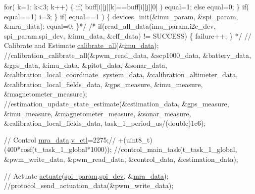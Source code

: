 \begin{DoxyCode}
{\textcolor{comment}{            for( k=1; k<3; k++)}
\textcolor{comment}{            \{}
\textcolor{comment}{              if( buff[i][j][k]==buff[i][j][0] )}
\textcolor{comment}{                equal=1;}
\textcolor{comment}{              else}
\textcolor{comment}{                equal=0;}
\textcolor{comment}{            \}}
\textcolor{comment}{          if( equal==1)}
\textcolor{comment}{            i=3;}
\textcolor{comment}{        \}}
\textcolor{comment}{        if( equal==1 )}
\textcolor{comment}{        \{}
\textcolor{comment}{          devices\_init(&imu\_param, &spi\_param, &mra\_data);}
\textcolor{comment}{          equal=0;}
\textcolor{comment}{        \}*/}
\textcolor{comment}{/*    if(read\_all\_data(imu\_param.i2c\_dev, spi\_param.spi\_dev, &imu\_data,
       &eff\_data) != SUCCESS)}
\textcolor{comment}{    \{}
\textcolor{comment}{        failure++;}
\textcolor{comment}{    \}}
\textcolor{comment}{*/}
    \textcolor{comment}{// Calibrate and Estimate}
    \hyperlink{calibration_2calibration_8c_a043045246cf217758281222214c4addc}{calibrate\_all}(&\hyperlink{main2_01_07C_xC3_xB3pia_01em_01conflito_01de_01Caio_01Gustavo_01Mesquita_01Angelo_012013-04-28_08_8c_a3cfea12cbe9ca7f1681c950e4cd68606}{imu\_data});
    \textcolor{comment}{//calibration\_calibrate\_all(&pwm\_read\_data, &scp1000\_data, &battery\_data,
       &gps\_data, &imu\_data, &pitot\_data, &sonar\_data,
       &calibration\_local\_coordinate\_system\_data, &calibration\_altimeter\_data, &calibration\_local\_fields\_data,
       &gps\_measure, &imu\_measure, &magnetometer\_measure);}
    \textcolor{comment}{//estimation\_update\_state\_estimate(&estimation\_data, &gps\_measure,
       &imu\_measure, &magnetometer\_measure, &sonar\_measure, &calibration\_local\_fields\_data,
       task\_1\_period\_us/(double)1e6);}

    \textcolor{comment}{// Control}
    \hyperlink{main2_01_07C_xC3_xB3pia_01em_01conflito_01de_01Caio_01Gustavo_01Mesquita_01Angelo_012013-04-28_08_8c_abc42e18d2909e9bc119316283f4ed9db}{mra\_data}.\hyperlink{structMRA__DATA__STRUCT_a64b4e6bb604e58de593a60c87942b966}{v\_ctl}=2275;\textcolor{comment}{//
      +(uint8\_t)(400*cosf(t\_task\_1\_global*1000));}
    \textcolor{comment}{//control\_main\_task(t\_task\_1\_global, &pwm\_write\_data, &pwm\_read\_data,
       &control\_data, &estimation\_data);}

    \textcolor{comment}{// Actuate}
    \hyperlink{communication_01_07C_xC3_xB3pia_01em_01conflito_01de_01Caio_01Gustavo_01Mesquita_01Angelo_012013-04-28_08_8c_a1d5f01d0124cff7030b5c4951b4bbefa}{actuate}(\hyperlink{main2_01_07C_xC3_xB3pia_01em_01conflito_01de_01Caio_01Gustavo_01Mesquita_01Angelo_012013-04-28_08_8c_adec2468b88cf50b20e5cf399a3b7e994}{spi\_param}.\hyperlink{structSPI__PARAM__STRUCT_abe385c44333d268d17cf648c8e371cad}{spi\_dev}, &\hyperlink{main2_01_07C_xC3_xB3pia_01em_01conflito_01de_01Caio_01Gustavo_01Mesquita_01Angelo_012013-04-28_08_8c_abc42e18d2909e9bc119316283f4ed9db}{mra\_data});
    \textcolor{comment}{//protocol\_send\_actuation\_data(&pwm\_write\_data);}

}
\end{DoxyCode}
